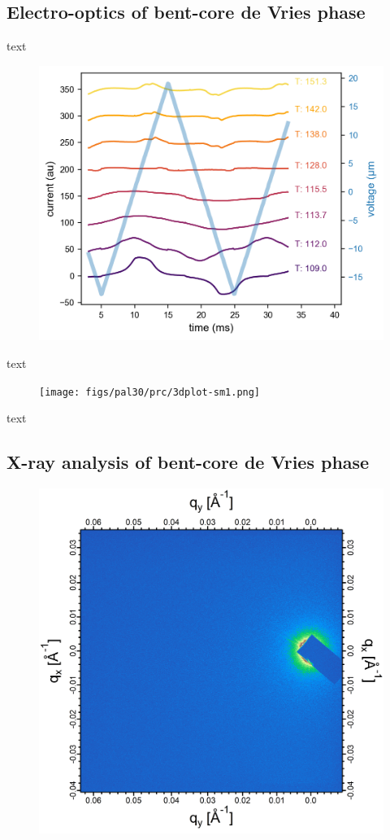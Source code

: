 \documentclass[aagreenthesis]{subfiles}
\begin{document}
\subsection{Electro-optics of bent-core de Vries phase}
text
\begin{figure}[h!]
    \centering
    \includegraphics[width=.8\textwidth]{figs/pal30/prc/spacedSm1PRC.png}
    \caption{\label{}}
\end{figure}
text

\begin{figure}[h!]
    \centering
    \texttt{[image: figs/pal30/prc/3dplot-sm1.png]}
    \caption{\label{}}
\end{figure}
text

\subsection{X-ray analysis of bent-core de Vries phase}

\begin{figure}[h!]
    \centering
    \includegraphics[width=.8\textwidth]{figs/pal30/xraysm1/rsosxSmaT113-modified.png}
    \caption{\label{}}
\end{figure}
\end{document}
